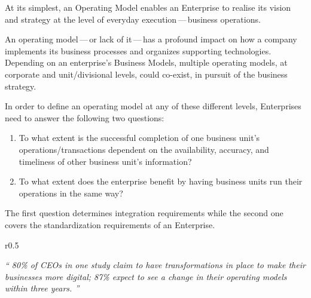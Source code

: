 %
%

At its simplest, an Operating Model enables an Enterprise to realise its vision and strategy
at the level of everyday execution\,---\,business operations.

An operating model\,---\,or lack of it\,---\,has a profound impact on how a company implements its
business processes and organizes supporting technologies.
Depending on an enterprise's Business Models, multiple operating models,
at corporate and unit/divisional levels, could co-exist, in pursuit of the business strategy.

In order to define an operating model at any of these different levels,
Enterprises need to answer the following two questions:

\begin{enumerate}
    \item To what extent is the successful completion of one business unit’s operations/transactions dependent on the
    availability, accuracy, and timeliness of other business unit’s information?
    \item To what extent does the enterprise benefit by having business units run their operations in the same way?
\end{enumerate}

The first question determines integration requirements while the second one covers the standardization requirements
of an Enterprise.

\begin{wrapfigure}[8]{r}{0.5\textwidth}
    \vspace{-12pt}
    \begin{center}
        \begin{tcolorbox}[colback=secondary!5,colframe=secondary!60,left=2pt,right=2pt]
            \itshape\large\enquote{%
                80\% of CEOs in one study claim to have transformations in place to make their businesses more digital;
                87\% expect to see a change in their operating models within three years.%
            }%
            \begin{flushright}\textcite{align_operating_model_to_strategy}\end{flushright}%
        \end{tcolorbox}
    \end{center}
\end{wrapfigure}

